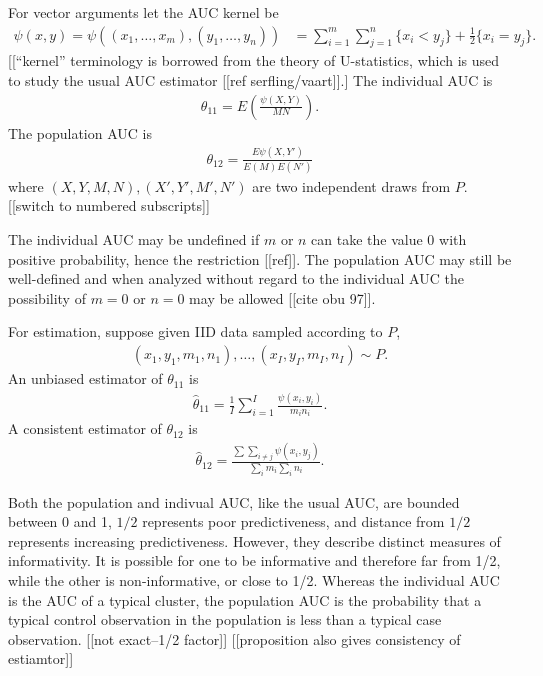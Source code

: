 \message{ !name(manuscript.tex)}\documentclass[12pt]{article}
\DeclareMathOperator{\AUC}{AUC}
\newcommand{\I}{I}
\newcommand{\E}{E}
\newcommand{\cind}{\perp \!\!\! \perp}
\newcommand{\aucindiv}{\theta_{11}}%
\newcommand{\aucpop}{\theta_{12}}%
\newcommand{\aucindivhat}{\hat{\theta}_{11}}%
\newcommand{\aucpophat}{\hat{\theta}_{12}}%
\newcommand{\kernel}{\psi}
\begin{document}
For vector arguments let the AUC kernel be
\begin{align}
  \kernel(x,y)=\kernel((x_1,\ldots,x_m),(y_1,\ldots,y_n))&=\sum_{i=1}^m\sum_{j=1}^n\{x_i<y_j\}+\frac{1}{2}\{x_i=y_j\}.
\end{align}
[[``kernel'' terminology is
borrowed from the theory of U-statistics, which is used to study the
usual AUC estimator [[ref serfling/vaart]].] The individual AUC is
\begin{align}
  \aucindiv=\E\left(\frac{\psi(X,Y)}{MN} \right).
\end{align}
The population AUC is
\begin{align}
  \aucpop=\frac{\E\psi(X,Y')}{\E(M)\E(N')}
\end{align}
where $(X,Y,M,N),(X',Y',M',N')$ are two independent draws from $P$.[[switch to numbered subscripts]]

The individual AUC may be undefined if $m$ or $n$ can take the value
$0$ with positive probability, hence the restriction [[ref]]. The
population AUC may still be well-defined and when analyzed without
regard to the individual AUC the possibility of $m=0$ or $n=0$ may be
allowed [[cite obu 97]].

For estimation, suppose given IID data sampled according to $P$,
\begin{align}
  (x_1,y_1,m_1,n_1),\ldots,(x_\I,y_\I,m_\I,n_\I) \sim P.
\end{align}
An unbiased estimator of $\aucindiv$ is
\begin{align}
  \aucindivhat = \frac{1}{I}\sum_{i=1}^\I \frac{\psi(x_i,y_i)}{m_in_i}.
\end{align}
A consistent estimator of $\aucpop$ is
\begin{align}
  \aucpophat = \frac{\sum\sum_{i\neq j}\psi(x_i,y_j)}{\sum_im_i\sum_in_i}.
\end{align}


Both the population and indivual AUC, like the usual AUC, are bounded
between 0 and 1, $1/2$ represents poor predictiveness, and distance
from $1/2$ represents increasing predictiveness. However, they
describe distinct measures of informativity. It is possible for one to
be informative and therefore far from 1/2, while the other is
non-informative, or close to 1/2.  Whereas the individual AUC is the
AUC of a typical cluster, the population AUC is the probability that a
typical control observation in the population is less than a typical
case observation. [[not exact--1/2 factor]] [[proposition also gives
consistency of estiamtor]]
\end{document}
